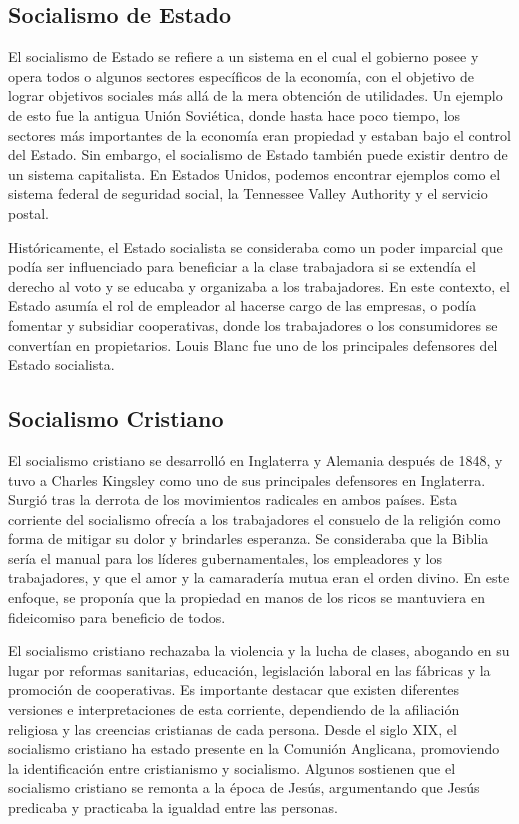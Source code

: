 \documentclass[
  jou,
  floatsintext,
  longtable,
  a4paper,
  nolmodern,
  notxfonts,
  notimes,
  12pt,
  colorlinks=true,linkcolor=blue,citecolor=blue,urlcolor=blue]{apa7}
\begin{document}
\subsection{Socialismo de Estado}\label{socialismo-de-estado}

El socialismo de Estado se refiere a un sistema en el cual el gobierno
posee y opera todos o algunos sectores específicos de la economía, con
el objetivo de lograr objetivos sociales más allá de la mera obtención
de utilidades. Un ejemplo de esto fue la antigua Unión Soviética, donde
hasta hace poco tiempo, los sectores más importantes de la economía eran
propiedad y estaban bajo el control del Estado. Sin embargo, el
socialismo de Estado también puede existir dentro de un sistema
capitalista. En Estados Unidos, podemos encontrar ejemplos como el
sistema federal de seguridad social, la Tennessee Valley Authority y el
servicio postal.

Históricamente, el Estado socialista se consideraba como un poder
imparcial que podía ser influenciado para beneficiar a la clase
trabajadora si se extendía el derecho al voto y se educaba y organizaba
a los trabajadores. En este contexto, el Estado asumía el rol de
empleador al hacerse cargo de las empresas, o podía fomentar y subsidiar
cooperativas, donde los trabajadores o los consumidores se convertían en
propietarios. Louis Blanc fue uno de los principales defensores del
Estado socialista.

\subsection{Socialismo Cristiano}\label{socialismo-cristiano}

El socialismo cristiano se desarrolló en Inglaterra y Alemania después
de 1848, y tuvo a Charles Kingsley como uno de sus principales
defensores en Inglaterra. Surgió tras la derrota de los movimientos
radicales en ambos países. Esta corriente del socialismo ofrecía a los
trabajadores el consuelo de la religión como forma de mitigar su dolor y
brindarles esperanza. Se consideraba que la Biblia sería el manual para
los líderes gubernamentales, los empleadores y los trabajadores, y que
el amor y la camaradería mutua eran el orden divino. En este enfoque, se
proponía que la propiedad en manos de los ricos se mantuviera en
fideicomiso para beneficio de todos.

El socialismo cristiano rechazaba la violencia y la lucha de clases,
abogando en su lugar por reformas sanitarias, educación, legislación
laboral en las fábricas y la promoción de cooperativas. Es importante
destacar que existen diferentes versiones e interpretaciones de esta
corriente, dependiendo de la afiliación religiosa y las creencias
cristianas de cada persona. Desde el siglo XIX, el socialismo cristiano
ha estado presente en la Comunión Anglicana, promoviendo la
identificación entre cristianismo y socialismo. Algunos sostienen que el
socialismo cristiano se remonta a la época de Jesús, argumentando que
Jesús predicaba y practicaba la igualdad entre las personas.
\end{document}
